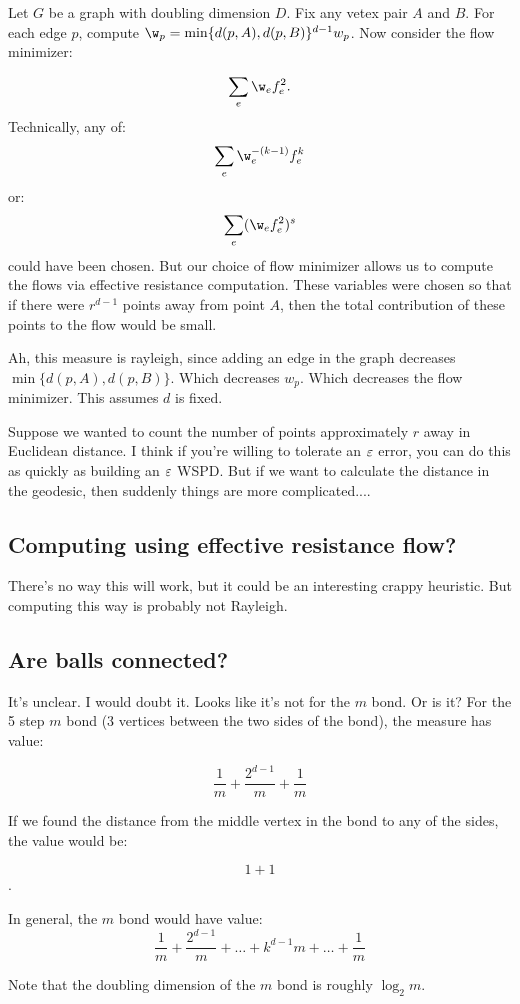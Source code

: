 Let $G$ be a graph with doubling dimension $D$. Fix any vetex
  pair
$A$ and $B$. For each edge $p$, compute $\w_p = \min\{ d(p,A), d(p, B)
  \}^{d-1}w_p$. Now consider the flow minimizer:

\[ \sum_e \w_e f_e^2.\]
Technically, any of:
\[ \sum_e \w_e^{-(k-1)} f_e^k\]
or:
\[ \sum_e (\w_e f_e^2)^s\]
could have been chosen. But our choice of flow minimizer allows us to compute the
flows via effective resistance computation. These variables were
chosen so that if there were $r^{d-1}$ points away from point
$A$, then the total contribution of these points to the flow
would be small.

Ah, this measure is rayleigh, since adding an edge in the graph decreases
$\min \{d(p,A), d(p, B)\}$. Which decreases $w_p$. Which
decreases the flow minimizer. This assumes $d$ is fixed. 

Suppose we wanted to count the number of points approximately $r$
away in Euclidean distance. I think if you're willing to tolerate an $\varepsilon$ error, you
can do this as quickly as building an $\varepsilon$ WSPD. But if we want
to calculate the distance in the geodesic, then suddenly things
are more complicated....

\subsection{Computing using effective resistance flow?}
There's no way this will work, but it could be an interesting
crappy heuristic.  But computing this way is probably not
Rayleigh.

\subsection{Are balls connected?}
It's unclear. I would doubt it. Looks like it's not for the $m$
bond. Or is it? For the 5 step $m$ bond (3 vertices between the
two sides of the bond), the measure has value:

\[ \frac{1}{m}+\frac{2^{d-1}}{m} + \frac{1}{m} \]

If we found the distance from the middle vertex in the bond to
any of the sides, the value would be:

\[ 1 + 1\].

In general, the $m$ bond would have value:
\[ \frac{1}{m}+\frac{2^{d-1}}{m} + \ldots +  k^{d-1}{m}  + \ldots
+ \frac{1}{m} \]

Note that the doubling dimension of the $m$ bond is roughly
$\log_2 m$.


